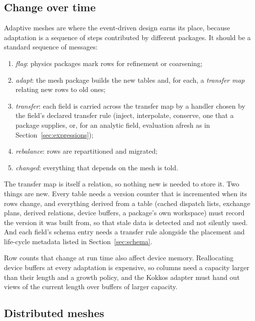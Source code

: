 \documentclass[11pt,a4paper]{article}
\begin{document}
\subsection{Change over time}
\label{sec:mesh-change}

Adaptive meshes are where the event-driven design earns its place, because
adaptation is a sequence of steps contributed by different packages.  It
should be a standard sequence of messages:

\begin{enumerate}
  \item \emph{flag}: physics packages mark rows for refinement or coarsening;
  \item \emph{adapt}: the mesh package builds the new tables and, for each, a
        \emph{transfer map} relating new rows to old ones;
  \item \emph{transfer}: each field is carried across the transfer map by a
        handler chosen by the field's declared transfer rule (inject,
        interpolate, conserve, one that a package supplies, or, for an
        analytic field, evaluation afresh as in
        Section~\ref{sec:expressions});
  \item \emph{rebalance}: rows are repartitioned and migrated;
  \item \emph{changed}: everything that depends on the mesh is told.
\end{enumerate}

The transfer map is itself a relation, so nothing new is needed to store it.
Two things are new.  Every table needs a version counter that is incremented
when its rows change, and everything derived from a table (cached dispatch
lists, exchange plans, derived relations, device buffers, a package's own
workspace) must record the version it was built from, so that stale data is
detected and not silently used.  And each field's schema entry needs a
transfer rule alongside the placement and life-cycle metadata listed in
Section~\ref{sec:schema}.

Row counts that change at run time also affect device memory.  Reallocating
device buffers at every adaptation is expensive, so columns need a capacity
larger than their length and a growth policy, and the Kokkos adapter must hand
out views of the current length over buffers of larger capacity.

\subsection{Distributed meshes}
\end{document}
